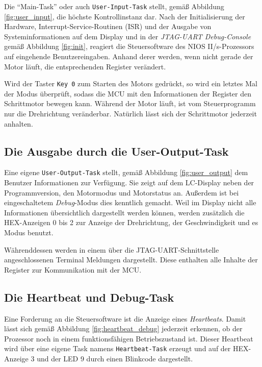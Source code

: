 \documentclass[ngerman,fontsize=12pt , paper=a4 , twoside=false , DIV12 , BCOR=1cm ,
numbers=enddot , listof=totoc , bibliography=totoc , index=totoc ,
headings=small , headlines=1.5 , final]{scrbook}
\begin{document}
Die \enquote{Main-Task} oder auch \lstinline!User-Input-Task! stellt,
gemäß Abbildung \ref{fig:user_input}, die höchste Kontrollinstanz dar.
Nach der Initialisierung der Hardware, Interrupt-Service-Routinen (ISR)
und der Ausgabe von Systeminformationen auf dem Display und in der
\emph{JTAG-UART Debug-Console} gemäß Abbildung \ref{fig:init}, reagiert
die Steuersoftware des NIOS II/s-Prozessors auf eingehende
Benutzereingaben. Anhand derer werden, wenn nicht gerade der Motor
läuft, die entsprechenden Register verändert.

Wird der Taster \lstinline!Key 0! zum Starten des Motors gedrückt, so
wird ein letztes Mal der Modus überprüft, sodass die MCU mit den
Informationen der Register den Schrittmotor bewegen kann. Während der
Motor läuft, ist vom Steuerprogramm nur die Drehrichtung veränderbar.
Natürlich lässt sich der Schrittmotor jederzeit anhalten.

\subsection{Die Ausgabe durch die
User-Output-Task}\label{die-ausgabe-durch-die-user-output-task}

Eine eigene \lstinline!User-Output-Task! stellt, gemäß Abbildung
\ref{fig:user_output} dem Benutzer Informationen zur Verfügung. Sie
zeigt auf dem LC-Display neben der Programmversion, den Motormodus und
Motorstatus an. Außerdem ist bei eingeschaltetem \emph{Debug}-Modus dies
kenntlich gemacht. Weil im Display nicht alle Informationen
übersichtlich dargestellt werden können, werden zusätzlich die
HEX-Anzeigen 0 bis 2 zur Anzeige der Drehrichtung, der Geschwindigkeit
und es Modus benutzt.

Währenddessen werden in einem über die JTAG-UART-Schnittstelle
angeschlossenen Terminal Meldungen dargestellt. Diese enthalten alle
Inhalte der Register zur Kommunikation mit der MCU.

\subsection{Die Heartbeat und
Debug-Task}\label{die-heartbeat-und-debug-task}

Eine Forderung an die Steuersoftware ist die Anzeige eines
\emph{Heartbeats}. Damit lässt sich gemäß Abbildung
\ref{fig:heartbeat_debug} jederzeit erkennen, ob der Prozessor noch in
einem funktionsfähigen Betriebszustand ist. Dieser Heartbeat wird über
eine eigene Task namens \lstinline!Heartbeat-Task! erzeugt und auf der
HEX-Anzeige 3 und der LED 9 durch einen Blinkcode dargestellt.
\end{document}
